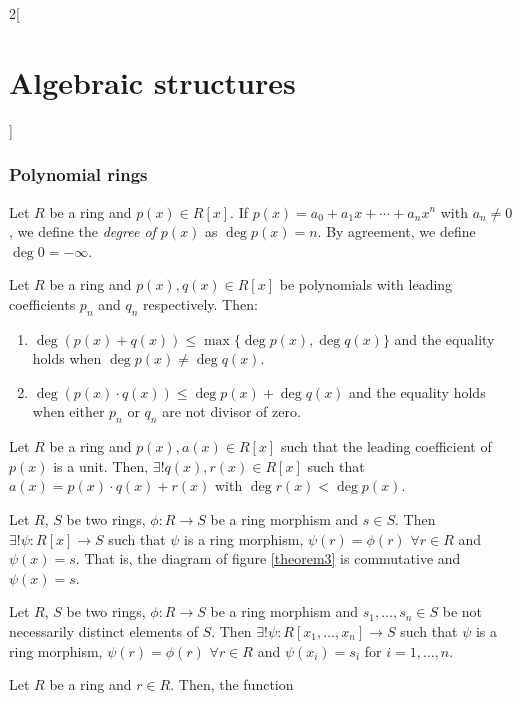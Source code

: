 \documentclass[../../../main.tex]{subfiles}
\begin{document}
\begin{multicols}{2}[\section{Algebraic structures}]
\subsubsection*{Polynomial rings}
\begin{definition}
    Let $R$ be a ring and $p(x)\in R[x]$. If $p(x)=a_0+a_1x+\cdots+a_nx^n$ with $a_n\ne 0$, we define the \textit{degree of $p(x)$} as $\deg p(x)=n$. By agreement, we define $\deg 0=-\infty$.
\end{definition}
\begin{prop}\label{AG-deg}
    Let $R$ be a ring and $p(x),q(x)\in R[x]$ be polynomials with leading coefficients $p_n$ and $q_n$ respectively. Then:
    \begin{enumerate}
        \item $\deg(p(x)+q(x))\leq\max\{\deg p(x),\deg q(x)\}$ and the equality holds when $\deg p(x)\ne\deg q(x)$.
        \item $\deg(p(x)\cdot q(x))\leq\deg p(x)+\deg q(x)$ and the equality holds when either $p_n$ or $q_n$ are not divisor of zero.
    \end{enumerate}
\end{prop}
\begin{prop}
    Let $R$ be a ring and $p(x),a(x)\in R[x]$ such that the leading coefficient of $p(x)$ is a unit. Then, $\exists! q(x),r(x)\in R[x]$ such that $a(x)=p(x)\cdot q(x)+r(x)$ with $\deg r(x)<\deg p(x)$.
\end{prop}
\begin{prop}
    Let $R$, $S$ be two rings, $\phi:R\rightarrow S$ be a ring morphism and $s\in S$. Then $\exists!\psi:R[x]\rightarrow S$ such that $\psi$ is a ring morphism, $\psi(r)=\phi(r)$ $\forall r\in R$ and $\psi(x)=s$. That is, the diagram of figure \ref{theorem3} is commutative and $\psi(x)=s$.
\end{prop}
\begin{prop}
    Let $R$, $S$ be two rings, $\phi:R\rightarrow S$ be a ring morphism and $s_1,\ldots,s_n\in S$ be not necessarily distinct elements of $S$. Then $\exists!\psi:R[x_1,\ldots,x_n]\rightarrow S$ such that $\psi$ is a ring morphism, $\psi(r)=\phi(r)$ $\forall r\in R$ and $\psi(x_i)=s_i$ for $i=1,\ldots,n$.
\end{prop}
\begin{corollary}
    Let $R$ be a ring and $r\in R$. Then, the function 
    \begin{align*}

\end{align*}
\end{corollary}
\end{multicols}
\end{document}
